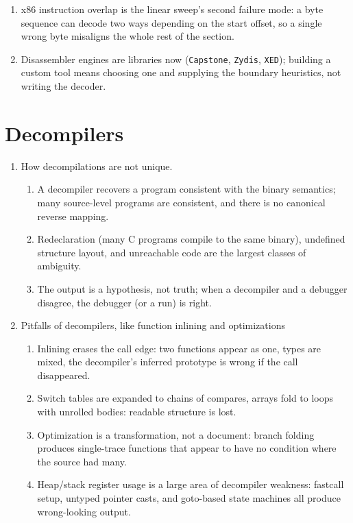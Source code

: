 \documentclass[12pt]{Training}
\begin{document}
\begin{enumerate}
\begin{enumerate}
        \item x86 instruction overlap is the linear sweep's second failure mode: a byte sequence can decode two ways depending on the start offset, so a single wrong byte misaligns the whole rest of the section.
        \item Disassembler engines are libraries now (\lstinline{Capstone}, \lstinline{Zydis}, \lstinline{XED}); building a custom tool means choosing one and supplying the boundary heuristics, not writing the decoder.
    \end{enumerate}
\end{enumerate}

\section*{Decompilers}
\begin{enumerate}
    \item How decompilations are not unique.
    \begin{enumerate}
        \item A decompiler recovers a program consistent with the binary semantics; many source-level programs are consistent, and there is no canonical reverse mapping.
        \item Redeclaration (many C programs compile to the same binary), undefined structure layout, and unreachable code are the largest classes of ambiguity.
        \item The output is a hypothesis, not truth; when a decompiler and a debugger disagree, the debugger (or a run) is right.
    \end{enumerate}
    \item Pitfalls of decompilers, like function inlining and optimizations
    \begin{enumerate}
        \item Inlining erases the call edge: two functions appear as one, types are mixed, the decompiler's inferred prototype is wrong if the call disappeared.
        \item Switch tables are expanded to chains of compares, arrays fold to loops with unrolled bodies: readable structure is lost.
        \item Optimization is a transformation, not a document: branch folding produces single-trace functions that appear to have no condition where the source had many.
        \item Heap/stack register usage is a large area of decompiler weakness: fastcall setup, untyped pointer casts, and goto-based state machines all produce wrong-looking output.

\end{enumerate}
\end{enumerate}
\end{document}
